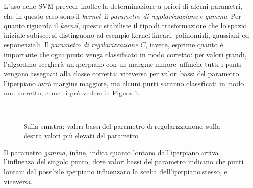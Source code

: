 \documentclass[oneside, openany]{book}
\begin{document}
	L'uso delle SVM prevede inoltre la determinazione a priori di alcuni parametri, che in questo caso sono il \textit{kernel}, il \textit{parametro di regolarizzazione} e \textit{gamma}. Per quanto riguarda il \textit{kernel}, questo stabilisce il tipo di trasformazione che lo spazio iniziale subisce: si distinguono ad esempio kernel lineari, polinomiali, gaussiani ed esponenziali. Il \textit{parametro di regolarizzazione} $C$, invece, esprime quanto è importante che ogni punto venga classificato in modo corretto: per valori grandi, l'algoritmo sceglierà un iperpiano con un margine minore, affinché tutti i punti vengano assegnati alla classe corretta; viceversa per valori bassi del parametro l'iperpiano avrà margine maggiore, ma alcuni punti saranno classificati in modo non corretto, come si può vedere in Figura \ref{fig:svm}.
	\begin{figure}[h]
		\centering
		 \quad
		 \\
		\caption{Sulla sinistra: valori bassi del parametro di regolarizzazione; sulla destra valori più elevati del parametro}
		\label{fig:svm}
	\end{figure}
	Il parametro \textit{gamma}, infine, indica quanto lontano dall'iperpiano arriva l'influenza del singolo punto, dove valori bassi del parametro indicano che punti lontani dal possibile iperpiano influenzano la scelta dell'iperpiano stesso, e viceversa.	
	
\end{document}
